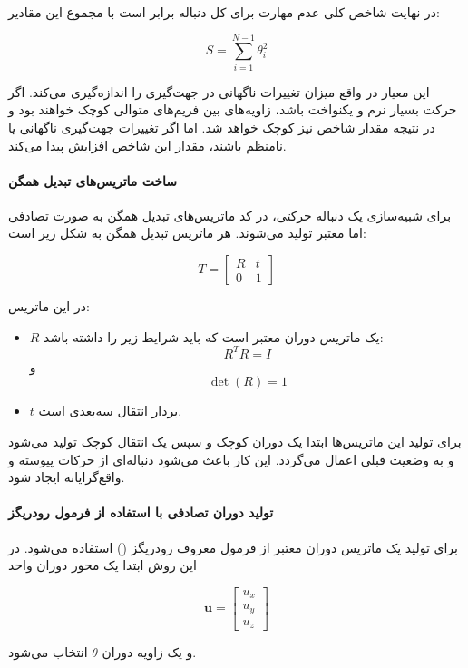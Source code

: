 \documentclass{article}
\begin{document}
در نهایت شاخص کلی عدم مهارت برای کل دنباله برابر است با مجموع این مقادیر:

\[
S = \sum_{i=1}^{N-1} \theta_i^2
\]

این معیار در واقع میزان تغییرات ناگهانی در جهت‌گیری را اندازه‌گیری می‌کند. اگر حرکت بسیار نرم و یکنواخت باشد، زاویه‌های بین فریم‌های متوالی کوچک خواهند بود و در نتیجه مقدار شاخص نیز کوچک خواهد شد. اما اگر تغییرات جهت‌گیری ناگهانی یا نامنظم باشند، مقدار این شاخص افزایش پیدا می‌کند.

\paragraph{ساخت ماتریس‌های تبدیل همگن}

برای شبیه‌سازی یک دنباله حرکتی، در کد ماتریس‌های تبدیل همگن به صورت تصادفی اما معتبر تولید می‌شوند. هر ماتریس تبدیل همگن به شکل زیر است:

\[
T =
\begin{bmatrix}
	R & t \\
	0 & 1
\end{bmatrix}
\]

در این ماتریس:

\begin{itemize}
	\item \(R\) یک ماتریس دوران معتبر است که باید شرایط زیر را داشته باشد:
	\[
	R^T R = I
	\]
	و
	\[
	\det(R) = 1
	\]
	
	\item \(t\) بردار انتقال سه‌بعدی است.
\end{itemize}

برای تولید این ماتریس‌ها ابتدا یک دوران کوچک و سپس یک انتقال کوچک تولید می‌شود و به وضعیت قبلی اعمال می‌گردد. این کار باعث می‌شود دنباله‌ای از حرکات پیوسته و واقع‌گرایانه ایجاد شود.

\paragraph{تولید دوران تصادفی با استفاده از فرمول رودریگز}

برای تولید یک ماتریس دوران معتبر از فرمول معروف رودریگز () استفاده می‌شود. در این روش ابتدا یک محور دوران واحد

\[
\mathbf{u} =
\begin{bmatrix}
	u_x \\ u_y \\ u_z
\end{bmatrix}
\]

و یک زاویه دوران \(\theta\) انتخاب می‌شود.
\end{document}
